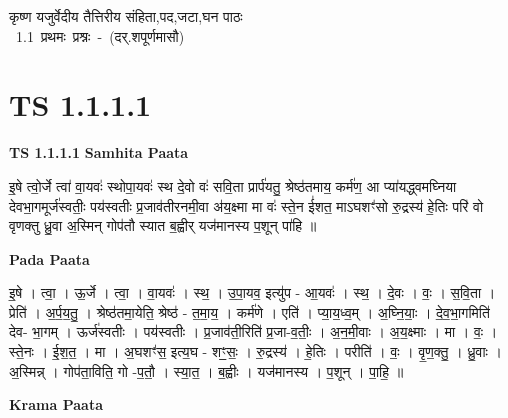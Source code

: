 \documentclass[17pt]{extarticle}
\begin{document}
\begin{titlepage}
    \begin{center}
 
\begin{sanskrit}
    { \Large
    कृष्ण यजुर्वेदीय तैत्तिरीय संहिता,पद,जटा,घन पाठः 
    }
    \\
    \vspace{2.5cm}
    \mbox{ \Large
    1.1     प्रथमः प्रश्नः - (दर्.शपूर्णमासौ)   }
\end{sanskrit}
\end{center}

\end{titlepage}
\tableofcontents
{}
\pagebreak


\section{ TS 1.1.1.1 }

\textbf{TS 1.1.1.1 } \newline
\textbf{Samhita Paata} \newline

इ॒षे त्वो॒र्जे त्वा॑ वा॒यवः॑ स्थोपा॒यवः॑ स्थ दे॒वो वः॑ सवि॒ता प्रार्प॑यतु॒ श्रेष्ठ॑तमाय॒ कर्म॑ण॒ आ प्या॑यद्ध्वमघ्निया देवभा॒गमूर्ज॑स्वतीः॒ पय॑स्वतीः प्र॒जाव॑तीरनमी॒वा अ॑य॒क्ष्मा मा वः॑ स्ते॒न ई॑शत॒ माऽघशꣳ॑सो रु॒द्रस्य॑ हे॒तिः परि॑ वो वृणक्तु ध्रु॒वा अ॒स्मिन् गोप॑तौ स्यात ब॒ह्वीर् यज॑मानस्य प॒शून् पा॑हि ॥ \newline

\textbf{Pada Paata} \newline

इ॒षे । त्वा॒ । ऊ॒र्जे । त्वा॒ । वा॒यवः॑ । स्थ॒ । उ॒पा॒यव॒ इत्यु॑प - आ॒यवः॑ । स्थ॒ । दे॒वः । वः॒ । स॒वि॒ता । प्रेति॑ । अ॒र्प॒य॒तु॒ । श्रेष्ठ॑तमा॒येति॒ श्रेष्ठ॑ - त॒मा॒य॒ । कर्म॑णे । एति॑ । प्या॒य॒ध्व॒म् । अ॒घ्नि॒याः॒ । दे॒व॒भा॒गमिति॑ देव- भा॒गम् । ऊर्ज॑स्वतीः । पय॑स्वतीः । प्र॒जाव॑ती॒रिति॑ प्र॒जा-व॒तीः॒ । अ॒न॒मी॒वाः । अ॒य॒क्ष्माः । मा । वः॒ । स्ते॒नः । ई॒श॒त॒ । मा । अ॒घशꣳ॑स॒ इत्य॒घ - शꣳ॒॒सः॒ । रु॒द्रस्य॑ । हे॒तिः । परीति॑ । वः॒ । वृ॒ण॒क्तु॒ । ध्रु॒वाः । अ॒स्मिन्न् । गोप॑ता॒विति॒ गो -प॒तौ॒ । स्या॒त॒ । ब॒ह्वीः । यज॑मानस्य । प॒शून् । पा॒हि॒ ॥  \newline


\textbf{Krama Paata} \newline
\end{document}
